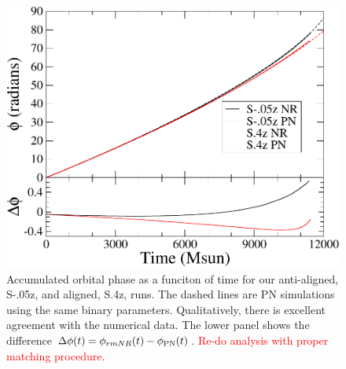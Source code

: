 \documentclass[aps,prd,amsmath,floatfix
,twocolumn
,superscriptaddress,nofootinbib,showpacs]{revtex4-1}
\theoremstyle{plain} \newtheorem{thm}{Theorem} \newtheorem{lem}{Lemma}
\newcommand{\red}[1]{\textcolor{Red}{#1}}
\begin{document}


\begin{figure}
\includegraphics[width=0.95\columnwidth]{Hangup}
\caption{ {\label{fig:Hangup}} Accumulated orbital phase as a funciton
  of time for our anti-aligned, S-.05z, and aligned, S.4z,
  runs. The dashed lines are PN simulations using the same
  binary parameters. Qualitatively, there is excellent agreement with
  the numerical data. The lower panel shows the difference
    $\Delta\phi(t)=\phi_{rm NR}(t)-\phi_{\rm PN}(t)$. \red{Re-do analysis with proper matching procedure.}}
\end{figure}
\end{document}
